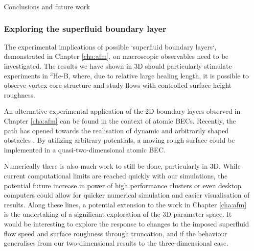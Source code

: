 \begin{chapter}{\label{cha:conc}Conclusions and future work}
\subsubsection{Exploring the superfluid boundary layer}
The experimental implications of possible `superfluid boundary layers`, demonstrated in Chapter \ref{cha:afm}, on macroscopic observables need to be investigated.  The results we have shown in 3D should particularly stimulate experiments in $^3$He-B, where, due to relative
large healing length, it is possible to observe vortex core structure and study flows with controlled surface height roughness.

An alternative experimental application of the 2D boundary layers observed in Chapter \ref{cha:afm} can be found in the context of atomic BECs. Recently, the path has opened towards the realisation of dynamic and arbitrarily shaped obstacles \cite{Henderson09}. By utilizing arbitrary potentials, a moving rough surface could be implemented in a quasi-two-dimensional atomic BEC.

Numerically there is also much work to still be done, particularly in 3D. While current computational limits are reached quickly with our simulations, the potential future increase in power of high performance clusters or even desktop computers could allow for quicker numerical simulation and easier visualisation of results. Along these lines, a potential extension to the work in Chapter \ref{cha:afm} is the undertaking of a significant exploration of the 3D parameter space. It would be interesting to explore the response to changes to the imposed superfluid flow speed and surface roughness through truncation, and if the behaviour generalises from our two-dimensional results to the three-dimensional case.
\end{chapter}